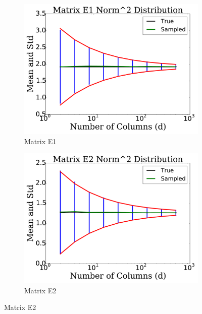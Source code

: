 \begin{figure}[p]
    \begin{subfigure}{0.45\textwidth}
    \includegraphics[width=\textwidth]{plots/mat_E1_error_test_2.pdf}
    \caption{Matrix E1}
    \end{subfigure}
    \begin{subfigure}{0.45\textwidth}
    \includegraphics[width=\textwidth]{plots/mat_E2_error_test_2.pdf}
    \caption{Matrix E2}
    \end{subfigure}


\end{figure}
